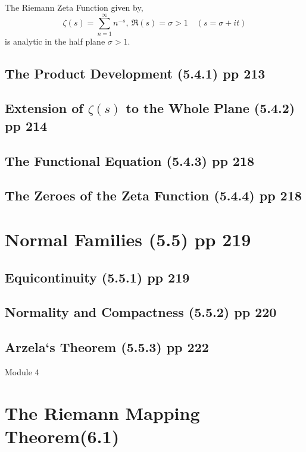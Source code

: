 \begin{definition}
	The Riemann Zeta Function given by,
\begin{equation}
	\zeta(s) = \sum_{n=1}^\infty n^{-s},\ \Re(s) = \sigma > 1 \quad (s = \sigma + it)
\end{equation}
	is analytic in the half plane $\sigma > 1$.
\end{definition}

\subsection{The Product Development (5.4.1) pp 213}
\subsection{Extension of $\zeta(s)$ to the Whole Plane (5.4.2) pp 214}
\subsection{The Functional Equation (5.4.3) pp 218}
\subsection{The Zeroes of the Zeta Function (5.4.4) pp 218}

\section{Normal Families (5.5) pp 219}
\subsection{Equicontinuity (5.5.1) pp 219}
\subsection{Normality and Compactness (5.5.2) pp 220}
\subsection{Arzela`s Theorem (5.5.3) pp 222}

\pagebreak
{\Large Module 4}
\section{The Riemann Mapping Theorem(6.1)}
